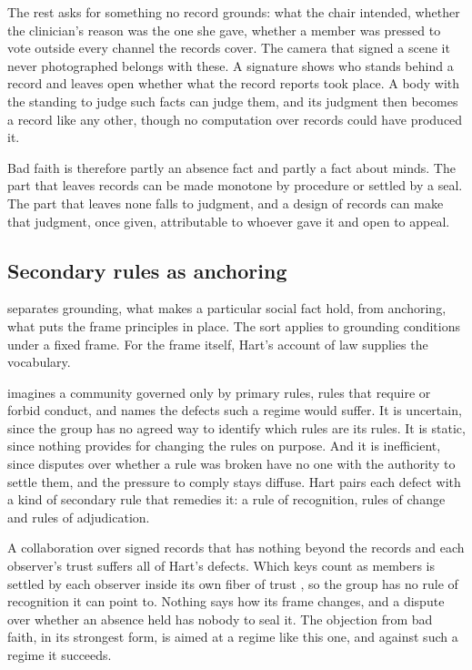 The rest asks for something no record grounds: what the chair intended, whether the clinician's
reason was the one she gave, whether a member was pressed to vote outside every channel the records
cover. The camera that signed a scene it never photographed belongs with these. A signature shows
who stands behind a record and leaves open whether what the record reports took place. A body with
the standing to judge such facts can judge them, and its judgment then becomes a record like any
other, though no computation over records could have produced it.

Bad faith is therefore partly an absence fact and partly a fact about minds. The part that leaves
records can be made monotone by procedure or settled by a seal. The part that leaves none falls to
judgment, and a design of records can make that judgment, once given, attributable to whoever gave
it and open to appeal.

\subsection{Secondary rules as anchoring}\label{sec:secondary}

\citet{epstein2015} separates grounding, what makes a particular social fact hold, from anchoring,
what puts the frame principles in place. The sort applies to grounding conditions under a fixed
frame. For the frame itself, Hart's account of law supplies the vocabulary.

\citet[ch.~5]{hart2012} imagines a community governed only by primary rules, rules that require or
forbid conduct, and names the defects such a regime would suffer. It is uncertain, since the group
has no agreed way to identify which rules are its rules. It is static, since nothing provides for
changing the rules on purpose. And it is inefficient, since disputes over whether a rule was broken
have no one with the authority to settle them, and the pressure to comply stays diffuse. Hart pairs
each defect with a kind of secondary rule that remedies it: a rule of recognition, rules of change
and rules of adjudication.

A collaboration over signed records that has nothing beyond the records and each observer's trust
suffers all of Hart's defects. Which keys count as members is settled by each observer inside its
own fiber of trust \citep{karna2026}, so the group has no rule of recognition it can point to.
Nothing says how its frame changes, and a dispute over whether an absence held has nobody to seal
it. The objection from bad faith, in its strongest form, is aimed at a regime like this one, and
against such a regime it succeeds.

